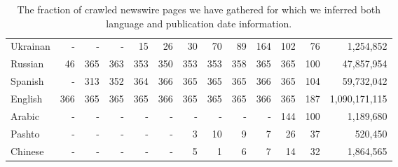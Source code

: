 \documentclass{article}
\begin{document}
\begin{table}[h!]
\begin{center}
\begin{tabular}{l|rrrrrrrrrrr|r}
Ukrainan	&	-	&	-	&	-	&	15	&	26	&	30	&	70	&	89	&	164	&	102	&	76	&	1,254,852\\
Russian	&	46	&	365	&	363	&	353	&	350	&	353	&	353	&	358	&	365	&	365	&	100	&	47,857,954\\
Spanish	&	-	&	313	&	352	&	364	&	366	&	365	&	365	&	365	&	366	&	365	&	104	&	59,732,042\\
English	&	366	&	365	&	365	&	365	&	366	&	365	&	365	&	365	&	366	&	365	&	187	&	1,090,171,115\\
Arabic	&	-	&	-	&	-	&	-	&	-	&	-	&	-	&	-	&	-	&	144	&	100	&	1,189,680\\
Pashto	&	-	&	-	&	-	&	-	&	-	&	3	&	10	&	9	&	7	&	26	&	37	&	520,450\\
Chinese	&	-	&	-	&	-	&	-	&	-	&	5	&	1	&	6	&	7	&	14	&	32	&	1,864,565\\
\end{tabular}
\end{center}
\normalsize
\caption{The fraction of crawled newswire pages we have gathered for which we inferred both language and publication date information.}
\label{fig:newsstats}
\end{table}
\end{document}
